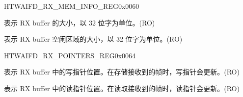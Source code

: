 \begin{register}{H}{TWAIFD\_RX\_MEM\_INFO\_REG}{0x0060}\label{regdesc:TWAIFDRXMEMINFOREG}
%
%
%
%
\regnewline%
\begin{regdesc}\begin{reglist}
\label{fielddesc:TWAIFDRXBUFFSIZE}\item [TWAIFD\_RX\_BUFF\_SIZE] 表示 RX buffer 的大小，以 32 位字为单位。(RO)
\label{fielddesc:TWAIFDRXFREE}\item [TWAIFD\_RX\_FREE] 表示 RX buffer 空闲区域的大小，以 32 位字为单位。(RO)
\end{reglist}\end{regdesc}
\end{register}


\begin{register}{H}{TWAIFD\_RX\_POINTERS\_REG}{0x0064}\label{regdesc:TWAIFDRXPOINTERSREG}
%
%
%
%
\regnewline%
\begin{regdesc}\begin{reglist}
\label{fielddesc:TWAIFDRXWPP}\item [TWAIFD\_RX\_WPP] 表示 RX buffer 中的写指针位置。在存储接收到的帧时，写指针会更新。(RO)
\label{fielddesc:TWAIFDRXRPP}\item [TWAIFD\_RX\_RPP] 表示 RX buffer 中的读指针位置。在读取接收到的帧时，读指针会更新。(RO)
\end{reglist}\end{regdesc}
\end{register}



